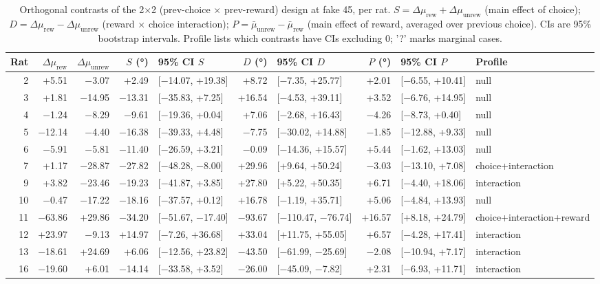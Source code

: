 \begin{table}[htbp]
  \centering
  \caption{Orthogonal contrasts of the 2$\times$2 (prev-choice $\times$ prev-reward) design at fake 45\textdegree, per rat. $S = \Delta\mu_{\mathrm{rew}} + \Delta\mu_{\mathrm{unrew}}$ (main effect of choice); $D = \Delta\mu_{\mathrm{rew}} - \Delta\mu_{\mathrm{unrew}}$ (reward $\times$ choice interaction); $P = \bar\mu_{\mathrm{unrew}} - \bar\mu_{\mathrm{rew}}$ (main effect of reward, averaged over previous choice). CIs are 95\% bootstrap intervals. Profile lists which contrasts have CIs excluding 0; '?' marks marginal cases.}
  \label{tab:orthogonal_contrasts}
  \begin{tabular}{rrrrlrlrll}
    \toprule
    Rat & $\Delta\mu_{\mathrm{rew}}$ & $\Delta\mu_{\mathrm{unrew}}$ & $S$ (°) & 95\% CI $S$ & $D$ (°) & 95\% CI $D$ & $P$ (°) & 95\% CI $P$ & Profile \\
    \midrule
    2 & +5.51 & −3.07 & +2.49 & [−14.07, +19.38] & +8.72 & [−7.35, +25.77] & +2.01 & [−6.55, +10.41] & null \\
    3 & +1.81 & −14.95 & −13.31 & [−35.83, +7.25] & +16.54 & [−4.53, +39.11] & +3.52 & [−6.76, +14.95] & null \\
    4 & −1.24 & −8.29 & −9.61 & [−19.36, +0.04] & +7.06 & [−2.68, +16.43] & −4.26 & [−8.73, +0.40] & null \\
    5 & −12.14 & −4.40 & −16.38 & [−39.33, +4.48] & −7.75 & [−30.02, +14.88] & −1.85 & [−12.88, +9.33] & null \\
    6 & −5.91 & −5.81 & −11.40 & [−26.59, +3.21] & −0.09 & [−14.36, +15.57] & +5.44 & [−1.62, +13.03] & null \\
    7 & +1.17 & −28.87 & −27.82 & [−48.28, −8.00] & +29.96 & [+9.64, +50.24] & −3.03 & [−13.10, +7.08] & choice+interaction \\
    9 & +3.82 & −23.46 & −19.23 & [−41.87, +3.85] & +27.80 & [+5.22, +50.35] & +6.71 & [−4.40, +18.06] & interaction \\
    10 & −0.47 & −17.22 & −18.16 & [−37.57, +0.12] & +16.78 & [−1.19, +35.71] & +5.06 & [−4.84, +13.93] & null \\
    11 & −63.86 & +29.86 & −34.20 & [−51.67, −17.40] & −93.67 & [−110.47, −76.74] & +16.57 & [+8.18, +24.79] & choice+interaction+reward \\
    12 & +23.97 & −9.13 & +14.97 & [−7.26, +36.68] & +33.04 & [+11.75, +55.05] & +6.57 & [−4.28, +17.41] & interaction \\
    13 & −18.61 & +24.69 & +6.06 & [−12.56, +23.82] & −43.50 & [−61.99, −25.69] & −2.08 & [−10.94, +7.17] & interaction \\
    16 & −19.60 & +6.01 & −14.14 & [−33.58, +3.52] & −26.00 & [−45.09, −7.82] & +2.31 & [−6.93, +11.71] & interaction \\
    \bottomrule
  \end{tabular}
\end{table}
